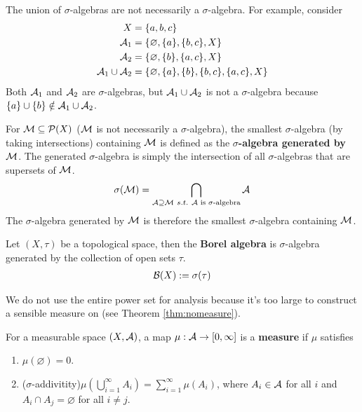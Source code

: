 \documentclass[11pt]{article}
\newcommand{\s}[0]{$\sigma$}
\begin{document}
	\begin{remark}
		The union of \s-algebras are not necessarily a \s-algebra. For example, consider
		\begin{align}
			X &= \{a, b, c\} \\
			\mathcal{{A}}_1 &= \{\varnothing, \{a\}, \{b, c\}, X\} \\
			\mathcal{{A}}_2 &= \{\varnothing, \{b\}, \{a, c\}, X\} \\
			\mathcal{{A}}_1 \cup \mathcal{{A}}_2 &= \{\varnothing, \{a\}, \{b\}, \{b, c\}, \{a, c\}, X\}
		\end{align}
		Both $\mathcal{{A}}_1$ and $\mathcal{{A}}_2$ are \s-algebras, but $\mathcal{{A}}_1 \cup \mathcal{{A}}_2$ is not a \s-algebra because $\{a\} \cup \{b\} \notin \mathcal{{A}}_1 \cup \mathcal{{A}}_2$.
	\end{remark}
	
	\begin{definition}
		For $\mathcal{{M}} \subseteq \mathcal{{P}}(X)$ ($\mathcal{{M}}$ is not necessarily a $\sigma$-algebra), the smallest $\sigma$-algebra (by taking intersections) containing $\mathcal{{M}}$ is defined as the \textbf{$\sigma$-algebra generated by $\mathcal{{M}}$}.
		The generated $\sigma$-algebra is simply the intersection of all $\sigma$-algebras that are supersets of $\mathcal{{M}}$.
		\begin{align}
			\sigma(\mc{M}) = \bigcap_{\mc{A} \supseteq \mc{M}\ s.t.\ \mc{A}\tx{ is $\sigma$-algebra}} \mc{A}
		\end{align}
		The \s-algebra generated by $\mathcal{{M}}$ is therefore the smallest \s-algebra containing $\mathcal{{M}}$.
	\end{definition}
	
	\begin{definition}
		Let $(X, \tau)$ be a topological space, then the \textbf{Borel algebra} is $\sigma$-algebra generated by the collection of open sets $\tau$.
		\begin{align}
			\mathcal{{B}}(X) := \sigma(\tau)
		\end{align}
	\end{definition}
	
	\begin{remark}
		We do not use the entire power set for analysis because it's too large to construct a sensible measure on (see Theorem \ref{thm:nomeasure}).
	\end{remark}
	
	\begin{definition}
		For a measurable space $(X, \mathcal{{A}})$, a map $\mu:\mathcal{{A}} \to [0, \infty]$ is a \textbf{measure} if $\mu$ satisfies
		\begin{enumerate}
			\item $\mu(\varnothing) = 0$.
			\item (\s-addivitity)$\mu\left(\bigcup_{i=1}^\infty A_i\right) = \sum_{i=1}^\infty \mu(A_i)$, where $A_i \in \mathcal{{A}}$ for all $i$ and $A_i \cap A_j = \varnothing$ for all $i \neq j$.
		\end{enumerate}
	\end{definition}
	
\end{document}
